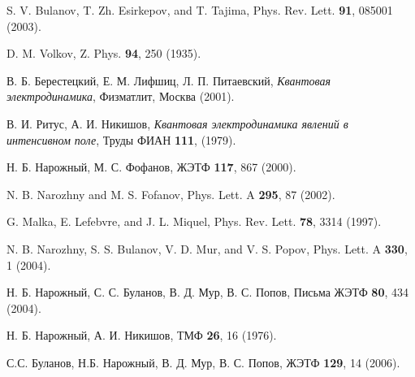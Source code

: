 \begin{thebibliography}{99}
S. V. Bulanov, T. Zh. Esirkepov, and T. Tajima, Phys. Rev. Lett.
\textbf{91}, 085001 (2003).

D. M. Volkov, Z. Phys. \textbf{94}, 250 (1935).

В. Б. Берестецкий, Е. М. Лифшиц, Л. П. Питаевский, \emph{Квантовая
электродинамика}, Физматлит, Москва (2001).

В. И. Ритус, А. И. Никишов, \emph{Квантовая электродинамика явлений
в интенсивном поле}, Труды ФИАН \textbf{111}, (1979).

Н. Б. Нарожный, М. С. Фофанов, ЖЭТФ \textbf{117}, 867 (2000).

N. B. Narozhny and M. S. Fofanov, Phys. Lett. A \textbf{295}, 87
(2002).

G. Malka, E. Lefebvre, and J. L. Miquel, Phys. Rev. Lett.
\textbf{78}, 3314 (1997).

N. B. Narozhny, S. S. Bulanov, V. D. Mur, and V. S. Popov, Phys.
Lett. A \textbf{330}, 1 (2004).

Н. Б. Нарожный, С. С. Буланов, В. Д. Мур, В. С. Попов, Письма ЖЭТФ
\textbf{80}, 434 (2004).

Н. Б. Нарожный, А. И. Никишов, ТМФ \textbf{26}, 16 (1976).

С.С. Буланов, Н.Б. Нарожный, В. Д. Мур, В. С. Попов, ЖЭТФ
\textbf{129}, 14 (2006).

\end{thebibliography}

